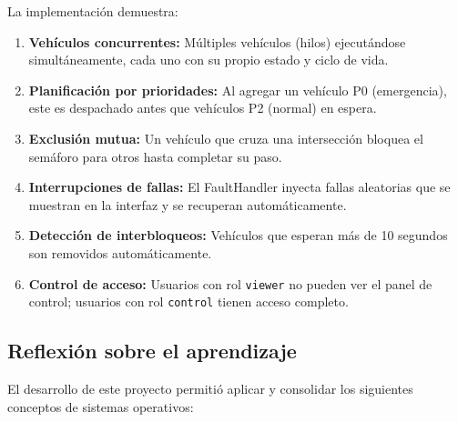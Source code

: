 \documentclass[12pt,a4paper]{article}
\begin{document}
La implementación demuestra:

\begin{enumerate}
    \item \textbf{Vehículos concurrentes:} Múltiples vehículos (hilos) ejecutándose simultáneamente, cada uno con su propio estado y ciclo de vida.
    
    \item \textbf{Planificación por prioridades:} Al agregar un vehículo P0 (emergencia), este es despachado antes que vehículos P2 (normal) en espera.
    
    \item \textbf{Exclusión mutua:} Un vehículo que cruza una intersección bloquea el semáforo para otros hasta completar su paso.
    
    \item \textbf{Interrupciones de fallas:} El FaultHandler inyecta fallas aleatorias que se muestran en la interfaz y se recuperan automáticamente.
    
    \item \textbf{Detección de interbloqueos:} Vehículos que esperan más de 10 segundos son removidos automáticamente.
    
    \item \textbf{Control de acceso:} Usuarios con rol \texttt{viewer} no pueden ver el panel de control; usuarios con rol \texttt{control} tienen acceso completo.
\end{enumerate}

\subsection{Reflexión sobre el aprendizaje}

El desarrollo de este proyecto permitió aplicar y consolidar los siguientes conceptos de sistemas operativos:
\end{document}
